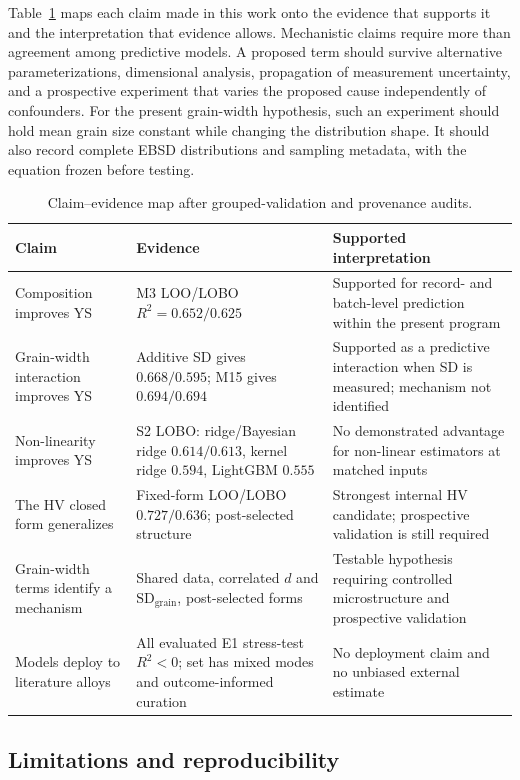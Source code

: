 \documentclass[5p,times,twocolumn]{elsarticle}
\begin{document}
Table~\ref{tab:evidence} maps each claim made in this work onto the evidence that supports it and the interpretation that evidence allows. Mechanistic claims require more than agreement among predictive models. A proposed term should survive alternative parameterizations, dimensional analysis, propagation of measurement uncertainty, and a prospective experiment that varies the proposed cause independently of confounders. For the present grain-width hypothesis, such an experiment should hold mean grain size constant while changing the distribution shape. It should also record complete EBSD distributions and sampling metadata, with the equation frozen before testing.

\begin{table}[t]
\centering
\caption{Claim--evidence map after grouped-validation and provenance audits.}
\label{tab:evidence}
\small
\begin{tabularx}{\textwidth}{@{}p{3.4cm}p{5.4cm}X@{}}
\toprule
Claim & Evidence & Supported interpretation \\
\midrule
Composition improves YS & M3 LOO/LOBO $R^2=0.652/0.625$ & Supported for record- and batch-level prediction within the present program \\
Grain-width interaction improves YS & Additive SD gives $0.668/0.595$; M15 gives $0.694/0.694$ & Supported as a predictive interaction when SD is measured; mechanism not identified \\
Non-linearity improves YS & S2 LOBO: ridge/Bayesian ridge $0.614/0.613$, kernel ridge $0.594$, LightGBM $0.555$ & No demonstrated advantage for non-linear estimators at matched inputs \\
The HV closed form generalizes & Fixed-form LOO/LOBO $0.727/0.636$; post-selected structure & Strongest internal HV candidate; prospective validation is still required \\
Grain-width terms identify a mechanism & Shared data, correlated $d$ and $\mathrm{SD}_{\mathrm{grain}}$, post-selected forms & Testable hypothesis requiring controlled microstructure and prospective validation \\
Models deploy to literature alloys & All evaluated E1 stress-test $R^2<0$; set has mixed modes and outcome-informed curation & No deployment claim and no unbiased external estimate \\
\bottomrule
\end{tabularx}
\end{table}

\subsection{Limitations and reproducibility}
\end{document}
